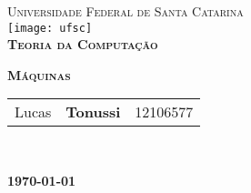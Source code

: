 \begin{titlepage}
\begin{center}

\textsc{\large Universidade Federal de Santa Catarina}\\[1cm]

\texttt{[image: ufsc]}\\[1.5cm]

\textsc{\LARGE \bfseries Teoria da Computação \\ [0.8cm]}

\textsc{\LARGE \bfseries Máquinas \\ [3cm]}

\begin{Large}
\begin{tabular}{|ccc}
Lucas &  \textbf{Tonussi} & \textsc{12106577}\\
\end{tabular} \\[0.5cm]
\end{Large}

\vfill

\textbf{\today}

\end{center}
\end{titlepage}